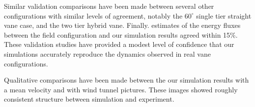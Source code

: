 Similar validation comparisons have been made between several other
configurations with similar levels of agreement,  notably the
$60^{\circ}$ single tier straight vane case, and the two tier hybrid
vane.  Finally. estimates of the energy fluxes between the field
configuration and our simulation results agreed within 15\%. These
validation studies have provided a modest level of confidence that our
simulations accurately reproduce the dynamics observed in real vane
configurations. 

Qualitative comparisons have been made between the our simulation
results with a mean velocity and with wind tunnel pictures. These images
showed roughly consistent structure between simulation and experiment. 

%
% 
%
% 
%
%
%
%
